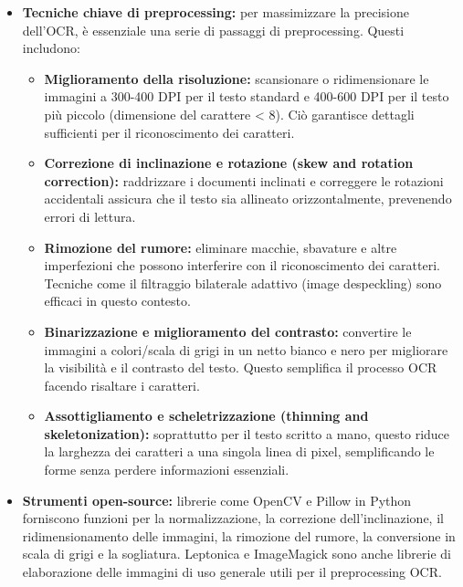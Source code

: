 \documentclass[a4paper, 11pt]{article}
\begin{document}
\begin{itemize}
   \item \textbf{Tecniche chiave di preprocessing:} per massimizzare la precisione dell'OCR, è essenziale una serie di passaggi di preprocessing. Questi includono:
   \begin{itemize}
        \item \textbf{Miglioramento della risoluzione:} scansionare o ridimensionare le immagini a 300-400 DPI per il testo standard e 400-600 DPI per il testo più piccolo (dimensione del carattere < 8). \cite{ocr_best_practices} Ciò garantisce dettagli sufficienti per il riconoscimento dei caratteri.
        \item \textbf{Correzione di inclinazione e rotazione (skew and rotation correction):} raddrizzare i documenti inclinati e correggere le rotazioni accidentali assicura che il testo sia allineato orizzontalmente, prevenendo errori di lettura. \cite{conexiom_ocr_problems}
        \item \textbf{Rimozione del rumore:} eliminare macchie, sbavature e altre imperfezioni che possono interferire con il riconoscimento dei caratteri. \cite{survey_ocr_preprocessing} Tecniche come il filtraggio bilaterale adattivo (image despeckling) sono efficaci in questo contesto. \cite{survey_ocr_preprocessing}
        \item \textbf{Binarizzazione e miglioramento del contrasto:} convertire le immagini a colori/scala di grigi in un netto bianco e nero per migliorare la visibilità e il contrasto del testo. \cite{survey_ocr_preprocessing} Questo semplifica il processo OCR facendo risaltare i caratteri.
        \item \textbf{Assottigliamento e scheletrizzazione (thinning and skeletonization):} soprattutto per il testo scritto a mano, questo riduce la larghezza dei caratteri a una singola linea di pixel, semplificando le forme senza perdere informazioni essenziali. \cite{docuclipper_ocr_preprocessing}
   \end{itemize}
    \item \textbf{Strumenti open-source:} librerie come OpenCV e Pillow in Python \cite{nextgeninvent_ocr_python} forniscono funzioni per la normalizzazione, la correzione dell'inclinazione, il ridimensionamento delle immagini, la rimozione del rumore, la conversione in scala di grigi e la sogliatura. Leptonica e ImageMagick sono anche librerie di elaborazione delle immagini di uso generale utili per il preprocessing OCR. \cite{survey_ocr_preprocessing}
\end{itemize}
\end{document}
